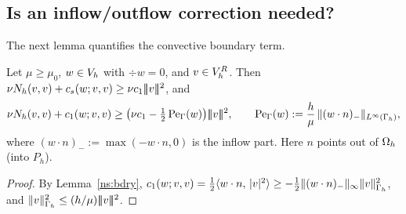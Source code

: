 \subsection{Is an inflow/outflow correction needed?}\label{ns:inflow}

The next lemma quantifies the convective boundary term.

\begin{lemma}\label{ns:pe}
Let $\mu\ge\mu_0$, $w\in V_h$ with $\div w=0$, and $v\in V_h^R$. Then $\nu N_h(v,v)+c_s(w;v,v)\ge\nu c_1|\!|\!|v|\!|\!|^2$, and
\[
\nu N_h(v,v)+c_1(w;v,v)\ge\bigl(\nu c_1-\tfrac12\,\mathrm{Pe}_\Gamma(w)\bigr)|\!|\!|v|\!|\!|^2,\qquad
\mathrm{Pe}_\Gamma(w):=\frac{h}{\mu}\,\lVert (w\cdot n)_-\rVert_{L^\infty(\Gamma_h)},
\]
where $(w\cdot n)_-:=\max(-w\cdot n,0)$ is the inflow part. Here $n$ points out of $\Omega_h$ (into $P_h$).
\end{lemma}

\begin{proof}
By Lemma~\ref{ns:bdry}, $c_1(w;v,v)=\frac12\langle w\cdot n,\, |v|^2\rangle\ge-\frac12\lVert (w\cdot n)_-\rVert_\infty\lVert v\rVert^2_{\Gamma_h}$, and $\lVert v\rVert^2_{\Gamma_h}\le(h/\mu)|\!|\!|v|\!|\!|^2$.
\end{proof}

